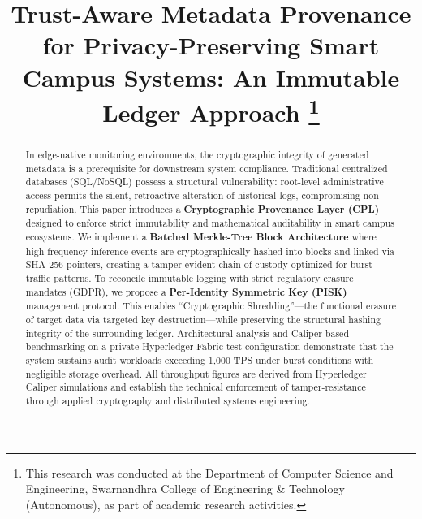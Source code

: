 \documentclass[conference]{IEEEtran}
\begin{document}
\title{Trust-Aware Metadata Provenance for Privacy-Preserving Smart Campus Systems: An Immutable Ledger Approach
\thanks{This research was conducted at the Department of Computer Science and Engineering, Swarnandhra College of Engineering \& Technology (Autonomous), as part of academic research activities.}
}

\author{
}

\maketitle

\begin{abstract}
In edge-native monitoring environments, the cryptographic integrity of generated metadata is a prerequisite for downstream system compliance. Traditional centralized databases (SQL/NoSQL) possess a structural vulnerability: root-level administrative access permits the silent, retroactive alteration of historical logs, compromising non-repudiation. This paper introduces a \textbf{Cryptographic Provenance Layer (CPL)} designed to enforce strict immutability and mathematical auditability in smart campus ecosystems. We implement a \textbf{Batched Merkle-Tree Block Architecture} where high-frequency inference events are cryptographically hashed into blocks and linked via SHA-256 pointers, creating a tamper-evident chain of custody optimized for burst traffic patterns. To reconcile immutable logging with strict regulatory erasure mandates (GDPR), we propose a \textbf{Per-Identity Symmetric Key (PISK)} management protocol. This enables ``Cryptographic Shredding''---the functional erasure of target data via targeted key destruction---while preserving the structural hashing integrity of the surrounding ledger. Architectural analysis and Caliper-based benchmarking on a private Hyperledger Fabric test configuration demonstrate that the system sustains audit workloads exceeding 1,000 TPS under burst conditions with negligible storage overhead. All throughput figures are derived from Hyperledger Caliper simulations and establish the technical enforcement of tamper-resistance through applied cryptography and distributed systems engineering.
\end{abstract}
\end{document}
